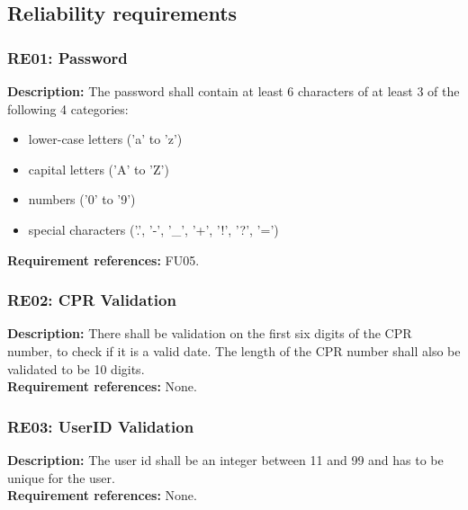 \subsection{Reliability requirements}
\begin{adjustwidth}{2em}{0pt}

    \subsubsection*{RE01: Password}
    \begin{adjustwidth}{1em}{0pt}
        \textbf{Description:}
        The password shall contain at least 6 characters of at least 3 of the following 4 categories: 
        \begin{itemize}
            \item lower-case letters ('a' to 'z')
            \item capital letters ('A' to 'Z')
            \item numbers ('0' to '9')
            \item special  characters ('.', '-', '\_', '+', '!', '?', '=')
        \end{itemize}
        \textbf{Requirement references:}
        FU05.
    \end{adjustwidth}

    \subsubsection*{RE02: CPR Validation}
    \begin{adjustwidth}{1em}{0pt}
        \textbf{Description:}
        There shall be validation on the first six digits of the CPR number, to check if it is a valid date. The length of the CPR number shall also be validated to be 10 digits.\\
        \textbf{Requirement references:}
        None.
    \end{adjustwidth}

    \subsubsection*{RE03: UserID Validation}
    \begin{adjustwidth}{1em}{0pt}
        \textbf{Description:}
        The user id shall be an integer between 11 and 99 and has to be unique for the user.\\
        \textbf{Requirement references:}
        None.
    \end{adjustwidth}
    

\end{adjustwidth}
